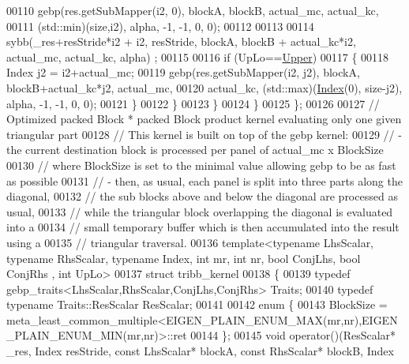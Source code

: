 \begin{DoxyCode}
00110           gebp(res.getSubMapper(i2, 0), blockA, blockB, actual\_mc, actual\_kc,
00111                (std::min)(size,i2), alpha, -1, -1, 0, 0);
00112 
00113 
00114         sybb(\_res+resStride*i2 + i2, resStride, blockA, blockB + actual\_kc*i2, actual\_mc, actual\_kc, alpha)
      ;
00115 
00116         \textcolor{keywordflow}{if} (UpLo==\hyperlink{group__enums_gga39e3366ff5554d731e7dc8bb642f83cda6bcb58be3b8b8ec84859ce0c5ac0aaec}{Upper})
00117         \{
00118           Index j2 = i2+actual\_mc;
00119           gebp(res.getSubMapper(i2, j2), blockA, blockB+actual\_kc*j2, actual\_mc,
00120                actual\_kc, (std::max)(\hyperlink{namespace_eigen_a62e77e0933482dafde8fe197d9a2cfde}{Index}(0), size-j2), alpha, -1, -1, 0, 0);
00121         \}
00122       \}
00123     \}
00124   \}
00125 \};
00126 
00127 \textcolor{comment}{// Optimized packed Block * packed Block product kernel evaluating only one given triangular part}
00128 \textcolor{comment}{// This kernel is built on top of the gebp kernel:}
00129 \textcolor{comment}{// - the current destination block is processed per panel of actual\_mc x BlockSize}
00130 \textcolor{comment}{//   where BlockSize is set to the minimal value allowing gebp to be as fast as possible}
00131 \textcolor{comment}{// - then, as usual, each panel is split into three parts along the diagonal,}
00132 \textcolor{comment}{//   the sub blocks above and below the diagonal are processed as usual,}
00133 \textcolor{comment}{//   while the triangular block overlapping the diagonal is evaluated into a}
00134 \textcolor{comment}{//   small temporary buffer which is then accumulated into the result using a}
00135 \textcolor{comment}{//   triangular traversal.}
00136 \textcolor{keyword}{template}<\textcolor{keyword}{typename} LhsScalar, \textcolor{keyword}{typename} RhsScalar, \textcolor{keyword}{typename} Index, \textcolor{keywordtype}{int} mr, \textcolor{keywordtype}{int} nr, \textcolor{keywordtype}{bool} ConjLhs, \textcolor{keywordtype}{bool} ConjRhs
      , \textcolor{keywordtype}{int} UpLo>
00137 \textcolor{keyword}{struct }tribb\_kernel
00138 \{
00139   \textcolor{keyword}{typedef} gebp\_traits<LhsScalar,RhsScalar,ConjLhs,ConjRhs> Traits;
00140   \textcolor{keyword}{typedef} \textcolor{keyword}{typename} Traits::ResScalar ResScalar;
00141 
00142   \textcolor{keyword}{enum} \{
00143     BlockSize  = meta\_least\_common\_multiple<EIGEN\_PLAIN\_ENUM\_MAX(mr,nr),EIGEN\_PLAIN\_ENUM\_MIN(mr,nr)>::ret
00144   \};
00145   \textcolor{keywordtype}{void} operator()(ResScalar* \_res, Index resStride, \textcolor{keyword}{const} LhsScalar* blockA, \textcolor{keyword}{const} RhsScalar* blockB, Index

\end{DoxyCode}
